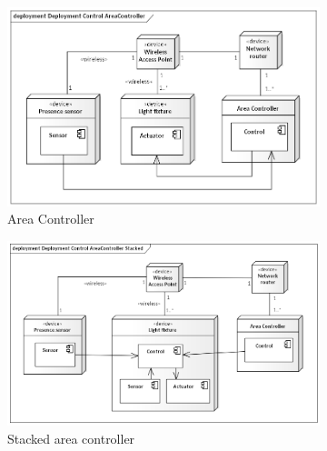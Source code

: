 \documentclass[11pt, english, a4paper, twoside]{article}
\begin{document}
\begin{figure}[h]
	\centering
	\begin{subfigure}[b]{0.45\textwidth}
		\includegraphics[width=\textwidth]{Deployment Control AreaController.png}
		\caption{Area Controller}
		\label{fig:area-controller}
	\end{subfigure}
    \hfill
    \begin{subfigure}[b]{0.45\textwidth}
		\centering
		\includegraphics[width=\textwidth]{Deployment Control AreaController Stacked.png}
		\caption{Stacked area controller}
		\label{fig:stacked-area-controller}
	\end{subfigure}
	\hfill
	\centering
	\begin{subfigure}[b]{0.45\textwidth}

\end{subfigure}
\end{figure}
\end{document}
